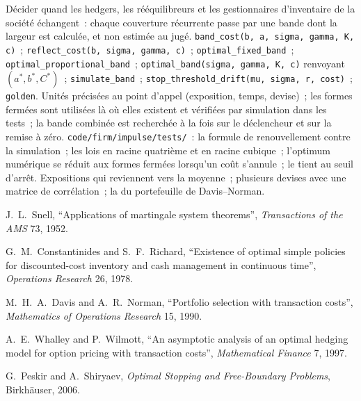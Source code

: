 \begin{build}
 Décider quand les hedgers, les rééquilibreurs et les gestionnaires d'inventaire de la société échangent~: chaque couverture récurrente passe par une
bande dont la largeur est calculée, et non estimée au jugé.
 \texttt{band\_cost(b, a, sigma, gamma, K, c)}~; \texttt{reflect\_cost(b, sigma, gamma, c)}~;
\texttt{optimal\_fixed\_band}~; \texttt{optimal\_proportional\_band}~; \texttt{optimal\_band(sigma, gamma, K, c)} renvoyant $(a^*, b^*,
C^*)$~; \texttt{simulate\_band}~; \texttt{stop\_threshold\_drift(mu, sigma, r, cost)}~; \texttt{golden}.
 Unités précisées au point d'appel (exposition, temps, devise)~; les formes fermées sont utilisées là où elles existent et vérifiées par
simulation dans les tests~; la bande combinée est recherchée à la fois sur le déclencheur et sur la remise à zéro.
 \texttt{code/firm/impulse/tests/}~: la formule de renouvellement contre la simulation~; les lois en racine quatrième et en racine cubique~;
l'optimum numérique se réduit aux formes fermées lorsqu'un coût s'annule~; le  tient au seuil d'arrêt.
 Expositions qui reviennent vers la moyenne~; plusieurs devises avec une matrice de corrélation~; la  du portefeuille de Davis--Norman.
\end{build}

\begin{omsources}
\item J.~L.~Snell, ``Applications of martingale system theorems'', \emph{Transactions of the AMS} 73, 1952.
\item G.~M.~Constantinides and S.~F.~Richard, ``Existence of optimal simple policies for discounted-cost inventory and cash
management in continuous time'', \emph{Operations Research} 26, 1978.
\item M.~H.~A.~Davis and A.~R.~Norman, ``Portfolio selection with transaction costs'', \emph{Mathematics of Operations Research}
15, 1990.
\item A.~E.~Whalley and P.~Wilmott, ``An asymptotic analysis of an optimal hedging model for option pricing with transaction
costs'', \emph{Mathematical Finance} 7, 1997.
\item G.~Peskir and A.~Shiryaev, \emph{Optimal Stopping and Free-Boundary Problems}, Birkhäuser, 2006.
\end{omsources}

